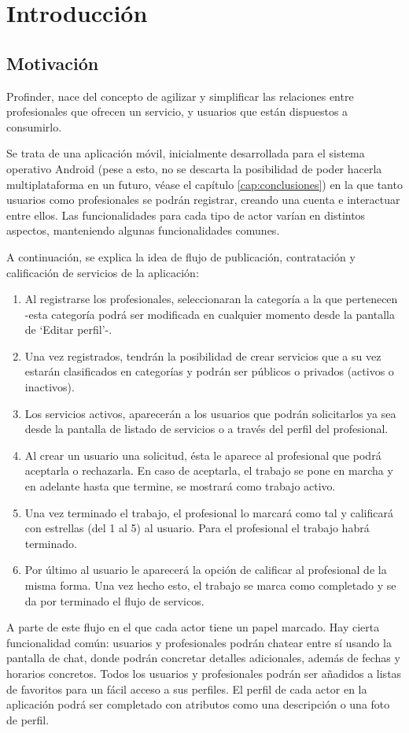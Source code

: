 \chapter{Introducción}
\label{cap:introduccion}


\section{Motivación}
Profinder, nace del concepto de agilizar y simplificar las relaciones entre profesionales que ofrecen un servicio, y usuarios que están dispuestos a consumirlo.

Se trata de una aplicación móvil, inicialmente desarrollada 
para el sistema operativo Android (pese a esto, no se descarta la posibilidad de poder hacerla multiplataforma en un futuro, véase el capítulo \ref{cap:conclusiones}) en la que tanto usuarios como profesionales se podrán registrar, creando una cuenta e interactuar entre ellos. Las funcionalidades para cada tipo de actor varían en distintos aspectos, manteniendo algunas funcionalidades comunes.  

A continuación, se explica la idea de flujo de publicación, contratación y calificación de servicios de la aplicación:
\begin{enumerate}
	\item Al registrarse los profesionales, seleccionaran la categoría a la que pertenecen -esta categoría podrá ser modificada en cualquier momento desde la pantalla de  ‘Editar perfil’-.
	\item Una vez registrados, tendrán la posibilidad de crear servicios que a su vez estarán clasificados en categorías y podrán ser públicos o privados (activos o inactivos).
	\item Los servicios activos, aparecerán a los usuarios que podrán solicitarlos ya sea desde la pantalla de listado de servicios o a través del perfil del profesional.
	\item Al crear un usuario una solicitud, ésta le aparece al profesional que podrá aceptarla o rechazarla. En caso de aceptarla, el trabajo se pone en marcha y en adelante hasta que termine, se mostrará como trabajo activo.
	\item Una vez terminado el trabajo, el profesional lo marcará como tal y calificará con estrellas (del 1 al 5) al usuario. Para el profesional el trabajo habrá terminado.
	\item Por último al usuario le aparecerá la opción de calificar al profesional de la misma forma. Una vez hecho esto, el trabajo se marca como completado y se da por terminado el flujo de servicos.
\end{enumerate}
A parte de este flujo en el que cada actor tiene un papel marcado. Hay cierta funcionalidad común: usuarios y profesionales podrán chatear entre sí usando la pantalla de chat, donde podrán concretar detalles adicionales, además de fechas y horarios concretos. Todos los usuarios y profesionales podrán ser añadidos a listas de favoritos para un fácil acceso a sus perfiles. El perfil de cada actor en la aplicación podrá ser completado con atributos como una descripción o una foto de perfil.

